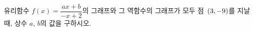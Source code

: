 유리함수 $f(x)=\dfrac{ax+b}{-x+2}$의 그래프와 그 역함수의 그래프가 모두 점~$(3{,}\mkern3mu\mathopen{}-9)$를 지날 때, 상수 $a$, $b$의 값을 구하시오.
